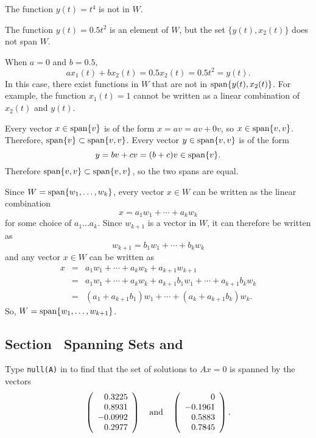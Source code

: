  The function $y(t) = t^4$ is not in $W$.

\ans The function $y(t) = 0.5t^2$ is an element of $W$, but the set
$\{y(t),x_2(t)\}$ does not span $W$.

\soln When $a = 0$ and $b = 0.5$,
\[ 
ax_1(t) + bx_2(t) = 0.5x_2(t) = 0.5t^2 = y(t). 
\]
In this case, there exist functions in $W$ that are not in 
${\rm span}\{y(t),x_2(t)\}$.  For example, the function $x_1(t) = 1$ cannot
be written as a linear combination of $x_2(t)$ and $y(t)$.

Every vector $x \in {\rm span}\{v\}$ is of the form $x = av
= av + 0v$, so $x \in {\rm span}\{v,v\}$.  Therefore, ${\rm span}\{v\}
\subset {\rm span}\{v,v\}$.  Every vector $y \in {\rm span}\{v,v\}$ is of the
form 
\[
y = bv + cv = (b + c)v \in {\rm span}\{v\}.
\]
Therefore ${\rm span}\{v,v\} \subset {\rm span}\{v,v\}$, so the two spans are equal.

Since $W = {\rm span}\{w_1,\dots ,w_k\}$, every vector $x \in W$ can be
written as the linear combination
\[ x = a_1w_1 + \cdots + a_kw_k \]
for some choice of $a_1 \dots a_k$.  Since $w_{k + 1}$ is a vector in
$W$, it can therefore be written as
\[ w_{k + 1} = b_1w_1 + \cdots + b_kw_k \]
and any vector $x \in W$ can be written as
\[ \begin{array}{rcl}
x & = &
a_1w_1 + \cdots + a_kw_k + a_{k+1}w_{k+1} \\
& = & a_1w_1 + \cdots + a_kw_k + a_{k+1}b_1w_1 + \cdots + a_{k+1}b_kw_k
\\ & = & (a_1 + a_{k+1}b_1)w_1 + \cdots + (a_k + a_{k+1}b_k)w_k.
\end{array} \]
So, $W = {\rm span}\{w_1,\dots ,w_{k+1}\}$.



\subsection*{Section~\protect{\ref{S:5.3}} Spanning Sets and \Matlab}

Type {\tt null(A)} in \Matlab to find that the set of solutions to
$Ax = 0$ is spanned by the vectors
\[
\left(\begin{array}{r} 0.3225 \\ 0.8931 \\ -0.0992 \\ 0.2977
\end{array}\right) \quad\mbox{and}\quad \left(\begin{array}{r} 0 \\ -0.1961 \\
0.5883 \\ 0.7845 \end{array}\right).
\]

